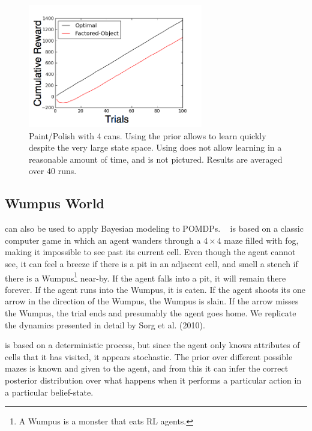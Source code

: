 
\begin{figure}
\vskip 0.2in
\begin{center}
\centerline{\includegraphics[width=3in]{figures/paint4can}}
\caption{
Paint/Polish with 4 cans. Using the  prior allows  to learn quickly despite the very large state space. Using  does not allow learning in a reasonable amount of time, and is not pictured. Results are averaged over $40$ runs.
}
\label{fig:paint4can}
\end{center}
\vskip -0.2in
\end{figure} 


\subsection{Wumpus World}

 can also be used to apply Bayesian modeling to POMDPs. ~\cite{russell94} is based on a classic computer game in which an agent wanders through a $4\times 4$ maze filled with fog, making it impossible to see past its current cell. Even though the agent cannot see, it can feel a breeze if there is a pit in an adjacent cell, and smell a stench if there is a Wumpus\footnote{A Wumpus is a monster that eats RL agents.} near-by. If the agent falls into a pit, it will remain there forever. If the agent runs into the Wumpus, it is eaten. If the agent shoots its one arrow in the direction of the Wumpus, the Wumpus is slain. If the arrow misses the Wumpus, the trial ends and presumably the agent goes home. We replicate the dynamics presented in detail by Sorg et al. (2010). %

 is based on a deterministic process, but since the agent only knows attributes of cells that it has visited, it appears stochastic. The prior over different possible mazes is known and given to the agent, and from this it can infer the correct posterior distribution over what happens when it performs a particular action in a particular belief-state.

